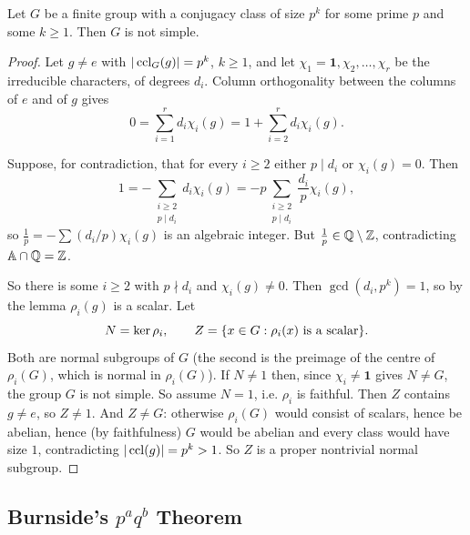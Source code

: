 \documentclass[a4paper]{scrartcl}
\begin{document}
\begin{theorem}[Burnside]
	Let $G$ be a finite group with a conjugacy class of size $p^k$ for some prime $p$ and some $k\geq 1$. Then $G$ is not simple.
\end{theorem}
\begin{proof}
	Let $g\neq e$ with $|\operatorname{ccl}_G(g)| = p^k$, $k\geq1$, and let $\chi_1 = \mathbf1,\chi_2,\dots,\chi_r$ be the irreducible characters, of degrees $d_i$. Column orthogonality between the columns of $e$ and of $g$ gives
	$$0 = \sum_{i=1}^r d_i\chi_i(g) = 1 + \sum_{i=2}^rd_i\chi_i(g).$$

	Suppose, for contradiction, that for every $i\geq 2$ either $p\mid d_i$ or $\chi_i(g) = 0$. Then
	$$1 = -\sum_{\substack{i\geq2 \\ p\mid d_i}}d_i\chi_i(g) = -p\sum_{\substack{i\geq2\\p\mid d_i}}\frac{d_i}{p}\chi_i(g),$$
	so $\frac1p = -\sum(d_i/p)\chi_i(g)$ is an algebraic integer. But $\frac1p\in\mathbb{Q}\setminus\mathbb{Z}$, contradicting $\mathbb A\cap\mathbb{Q} = \mathbb{Z}$.

	So there is some $i\geq 2$ with $p\nmid d_i$ and $\chi_i(g)\neq0$. Then $\gcd(d_i, p^k) = 1$, so by the lemma $\rho_i(g)$ is a scalar. Let
	$$N = \operatorname{ker}\rho_i, \qquad Z = \{x\in G : \rho_i(x)\text{ is a scalar}\}.$$
	Both are normal subgroups of $G$ (the second is the preimage of the centre of $\rho_i(G)$, which is normal in $\rho_i(G)$). If $N\neq 1$ then, since $\chi_i\neq\mathbf1$ gives $N\neq G$, the group $G$ is not simple. So assume $N = 1$, i.e. $\rho_i$ is faithful. Then $Z$ contains $g\neq e$, so $Z\neq 1$. And $Z\neq G$: otherwise $\rho_i(G)$ would consist of scalars, hence be abelian, hence (by faithfulness) $G$ would be abelian and every class would have size $1$, contradicting $|\operatorname{ccl}(g)| = p^k>1$. So $Z$ is a proper nontrivial normal subgroup.
\end{proof}

\subsection{Burnside's \texorpdfstring{$p^aq^b$}{p\textasciicircum a q\textasciicircum b} Theorem}
\end{document}
